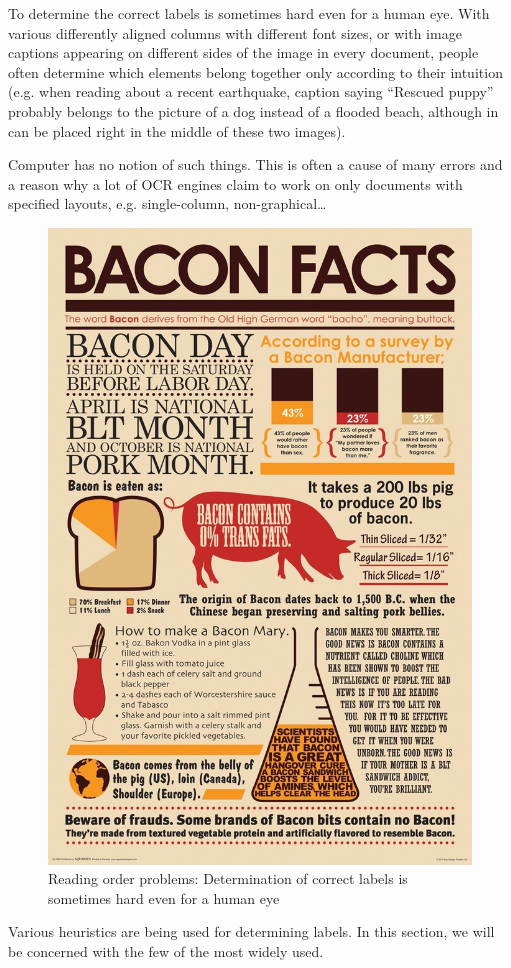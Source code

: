 To determine the correct labels is sometimes hard even for a human eye. With various differently aligned columns with different font sizes, or with image captions appearing on different sides of the image in every document, people often determine which elements belong together only according to their intuition (e.g. when reading about a recent earthquake, caption saying “Rescued puppy” probably belongs to the picture of a dog instead of a flooded beach, although in can be placed right in the middle of these two images).

Computer has no notion of such things. This is often a cause of many errors and a reason why a lot of OCR engines claim to work on only documents with specified layouts, e.g. single-column, non-graphical\ldots

\begin{figure}[H]
\centering
\includegraphics[width=0.5\linewidth]{img/readingOrderIssue.jpg}
\caption{Reading order problems: Determination of correct labels is sometimes hard even for a human eye} \label{fig:1a}
\end{figure}

Various heuristics are being used for determining labels\cite{logicalLayoutTemplate}. In this section, we will be concerned with the few of the most widely used.

